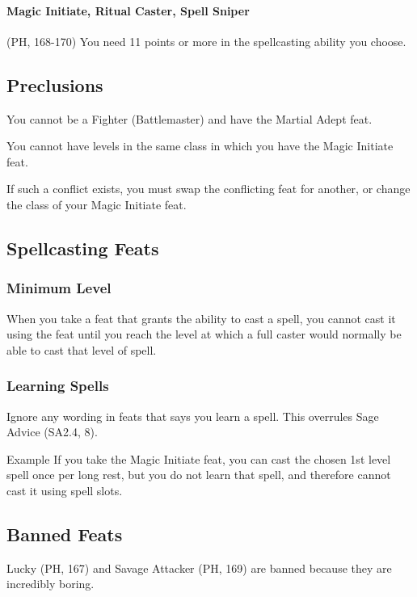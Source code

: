 \documentclass[letterpaper,twocolumn,openany,nodeprecatedcode]{dndbook}
\begin{document}
\paragraph{Magic Initiate, Ritual Caster, Spell Sniper} (PH, 168-170) You need 11 points or more in the spellcasting ability you choose.

\subsection{Preclusions}
You cannot be a Fighter (Battlemaster) and have the Martial Adept feat.

You cannot have levels in the same class in which you have the Magic Initiate feat.

If such a conflict exists, you must swap the conflicting feat for another, or change the class of your Magic Initiate feat.

\subsection{Spellcasting Feats}

\subsubsection{Minimum Level}
When you take a feat that grants the ability to cast a spell, you cannot cast it using the feat until you reach the level at which a full caster would normally be able to cast that level of spell.

\subsubsection{Learning Spells}
Ignore any wording in feats that says you learn a spell. This overrules Sage Advice (SA2.4, 8).

\begin{DndComment}{Example}
If you take the Magic Initiate feat, you can cast the chosen 1st level spell once per long rest, but you do not learn that spell, and therefore cannot cast it using spell slots.
\end{DndComment}

\label{balance-feats-banned}
\subsection{Banned Feats}
Lucky (PH, 167) and Savage Attacker (PH, 169) are banned because they are incredibly boring.
\end{document}
